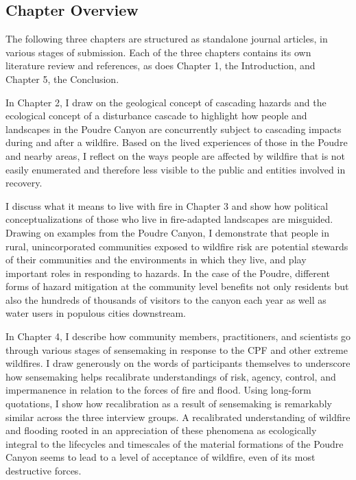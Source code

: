 \documentclass[
]{article}
\begin{document}
\subsection{Chapter Overview}\label{chapter-overview}

The following three chapters are structured as standalone journal articles, in various stages of submission. Each of the three chapters contains its own literature review and references, as does Chapter 1, the Introduction, and Chapter 5, the Conclusion.

In Chapter 2, I draw on the geological concept of cascading hazards and the ecological concept of a disturbance cascade to highlight how people and landscapes in the Poudre Canyon are concurrently subject to cascading impacts during and after a wildfire. Based on the lived experiences of those in the Poudre and nearby areas, I reflect on the ways people are affected by wildfire that is not easily enumerated and therefore less visible to the public and entities involved in recovery.

I discuss what it means to live with fire in Chapter 3 and show how political conceptualizations of those who live in fire-adapted landscapes are misguided. Drawing on examples from the Poudre Canyon, I demonstrate that people in rural, unincorporated communities exposed to wildfire risk are potential stewards of their communities and the environments in which they live, and play important roles in responding to hazards. In the case of the Poudre, different forms of hazard mitigation at the community level benefits not only residents but also the hundreds of thousands of visitors to the canyon each year as well as water users in populous cities downstream.

In Chapter 4, I describe how community members, practitioners, and scientists go through various stages of sensemaking in response to the CPF and other extreme wildfires. I draw generously on the words of participants themselves to underscore how sensemaking helps recalibrate understandings of risk, agency, control, and impermanence in relation to the forces of fire and flood. Using long-form quotations, I show how recalibration as a result of sensemaking is remarkably similar across the three interview groups. A recalibrated understanding of wildfire and flooding rooted in an appreciation of these phenomena as ecologically integral to the lifecycles and timescales of the material formations of the Poudre Canyon seems to lead to a level of acceptance of wildfire, even of its most destructive forces.
\end{document}
